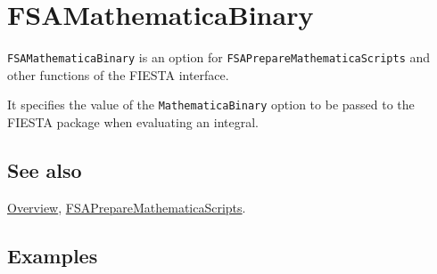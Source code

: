 \documentclass[../FeynHelpersManual.tex]{subfiles}
\begin{document}
\hypertarget{fsamathematicabinary}{
\section{FSAMathematicaBinary}\label{fsamathematicabinary}}

\texttt{FSAMathematicaBinary} is an option for
\texttt{FSAPrepareMathematicaScripts} and other functions of the FIESTA
interface.

It specifies the value of the \texttt{MathematicaBinary} option to be
passed to the FIESTA package when evaluating an integral.

\subsection{See also}

\hyperlink{toc}{Overview},
\hyperlink{fsapreparemathematicascripts}{FSAPrepareMathematicaScripts}.

\subsection{Examples}
\end{document}
